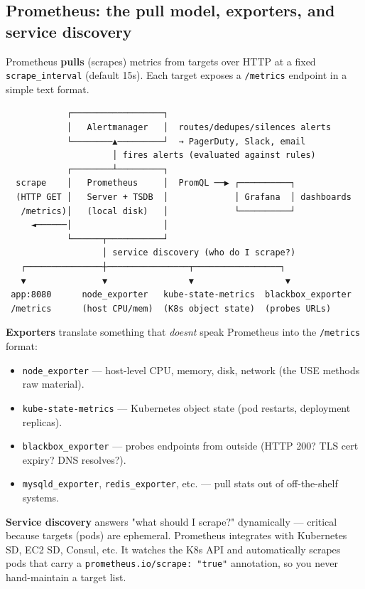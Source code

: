 \documentclass[11pt]{article}
\providecommand{\tightlist}{\setlength{\itemsep}{1pt}\setlength{\parskip}{0pt}}
\begin{document}
\subsection{Prometheus: the pull model, exporters, and service discovery}\label{prometheus-the-pull-model-exporters-and-service-discovery}

Prometheus \textbf{pulls} (scrapes) metrics from targets over HTTP at a fixed \texttt{scrape\_interval} (default 15s). Each target exposes a \texttt{/metrics} endpoint in a simple text format.

\setcodelang{}

\begin{verbatim}
            ┌──────────────────┐
            │   Alertmanager   │  routes/dedupes/silences alerts
            └────────▲─────────┘  → PagerDuty, Slack, email
                     │ fires alerts (evaluated against rules)
            ┌────────┴─────────┐
  scrape    │   Prometheus     │  PromQL ──▶ ┌──────────┐
  (HTTP GET │   Server + TSDB  │             │ Grafana  │ dashboards
   /metrics)│   (local disk)   │             └──────────┘
     ◄──────│                  │
            └──────┬───────────┘
                   │ service discovery (who do I scrape?)
   ┌───────────────┼────────────────┬─────────────────┐
   ▼               ▼                ▼                  ▼
 app:8080      node_exporter   kube-state-metrics  blackbox_exporter
 /metrics      (host CPU/mem)  (K8s object state)  (probes URLs)
\end{verbatim}

\textbf{Exporters} translate something that \emph{doesn\textquotesingle t} speak Prometheus into the \texttt{/metrics} format:

\begin{itemize}
\tightlist
\item
  \texttt{node\_exporter} --- host-level CPU, memory, disk, network (the USE method\textquotesingle s raw material).
\item
  \texttt{kube-state-metrics} --- Kubernetes object state (pod restarts, deployment replicas).
\item
  \texttt{blackbox\_exporter} --- probes endpoints from outside (HTTP 200? TLS cert expiry? DNS resolves?).
\item
  \texttt{mysqld\_exporter}, \texttt{redis\_exporter}, etc. --- pull stats out of off-the-shelf systems.
\end{itemize}

\textbf{Service discovery} answers "what should I scrape?" dynamically --- critical because targets (pods) are ephemeral. Prometheus integrates with Kubernetes SD, EC2 SD, Consul, etc. It watches the K8s API and automatically scrapes pods that carry a \texttt{prometheus.io/scrape:\ "true"} annotation, so you never hand-maintain a target list.
\end{document}
